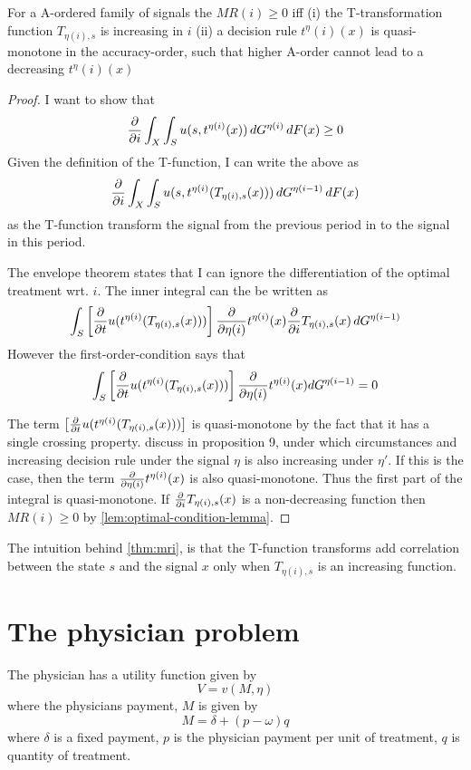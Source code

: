 \documentclass[10pt,a4paper]{article} 					%
\begin{document}
\begin{thm}\label{thm:mri}
For a A-ordered family of signals the \(MR(i)\geq0\) iff (i) the T-transformation function \(T_{\eta(i),s}\) is increasing in \(i\) (ii) a decision rule \(t^\eta(i)(x)\) is quasi-monotone in the accuracy-order, such that higher A-order cannot lead to a decreasing \(t^\eta(i)(x)\)
\end{thm}
\begin{proof}
I want to show that
\[
	\pder{i}\int_X\int_S u(s,t^{\eta(i)}(x))\, dG^{\eta(i)}\, dF(x)\geq0
\]
Given the definition of the T-function, I can write the above as
\[
	\pder{i}\int_X\int_S u(s,t^{\eta(i)}(T_{\eta(i),s}(x)))\, dG^{\eta(i-1)}\, dF(x)
\]
as the T-function transform the signal from the previous period in to the signal in this period.

The envelope theorem states that I can ignore the differentiation of the optimal treatment wrt. \(i\). The inner integral can the be written as
\[
	\int_S \left[\pder{t}u(t^{\eta(i)}(T_{\eta(i),s}(x)))\right]\pder{\eta(i)}t^{\eta(i)}(x)\pder{i}T_{\eta(i),s}(x)\, dG^{\eta(i-1)}
\]
However the first-order-condition says that
\[
	\int_S \left[\pder{t}u(t^{\eta(i)}(T_{\eta(i),s}(x)))\right]\pder{\eta(i)}t^{\eta(i)}(x)dG^{\eta(i-1)}=0
\]

The term \(\left[\pder{t}u(t^{\eta(i)}(T_{\eta(i),s}(x)))\right]\) is quasi-monotone by the fact that it has a single crossing property. \textcite{Quah2009} discuss in proposition 9, under which circumstances and increasing decision rule under the signal \(\eta\) is also increasing under \(\eta'\). If this is the case, then the term \(\pder{\eta(i)}t^{\eta(i)}(x)\) is also quasi-monotone. Thus the first part of the integral is quasi-monotone. If \(\pder{i}T_{\eta(i),s}(x)\) is a non-decreasing function then \(MR(i)\geq0\) by \cref{lem:optimal-condition-lemma}.
\end{proof}
The intuition behind \cref{thm:mri}, is that the T-function transforms add correlation between the state \(s\) and the signal \(x\) only when \(T_{\eta(i),s}\) is an increasing function.

\section{The physician problem}
The physician has a utility function given by
\[
	V=v(M,\eta)
\]
where the physicians payment, \(M\) is given by
\[
	M=\delta+(p-\omega)q
\]
where \(\delta\) is a fixed payment, \(p\) is the physician payment per unit of treatment, \(q\) is quantity of treatment.
\end{document}
